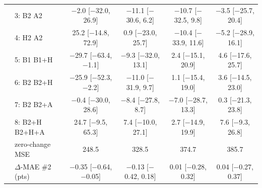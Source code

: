 \begin{table}[h]
{\begin{tabular}{llcccc}
 & 3: B2 \cto{} A2 & $-$2.0 [$-$32.0, 26.9] & $-$11.1 [$-$30.6, 6.2] & $-$10.7 [$-$32.5, 9.8] & $-$3.5 [$-$25.7, 20.4] \\
 & 4: H2 \cto{} A2 & 25.2 [$-$14.8, 72.9] & 0.9 [$-$23.0, 25.7] & $-$10.4 [$-$33.9, 11.6] & $-$5.2 [$-$28.9, 16.1] \\
 & 5: B1 \cto{} B1+H & $-$29.7 [$-$63.4, $-$1.1] & $-$9.3 [$-$32.0, 13.1] & 2.4 [$-$15.1, 20.9] & 4.6 [$-$17.6, 25.7] \\
 & 6: B2 \cto{} B2+H & $-$25.9 [$-$52.3, $-$2.2] & $-$11.0 [$-$31.9, 9.7] & 1.1 [$-$15.4, 19.0] & 3.6 [$-$14.5, 23.0] \\
 & 7: B2 \cto{} B2+A & $-$0.4 [$-$30.0, 28.6] & $-$8.4 [$-$27.8, 8.7] & $-$7.0 [$-$28.7, 13.3] & 0.3 [$-$21.3, 23.8] \\
 & 8: B2+H \cto{} B2+H+A & 24.7 [$-$9.5, 65.3] & 7.4 [$-$10.0, 27.1] & 2.7 [$-$14.9, 19.9] & 7.6 [$-$9.3, 26.8] \\
 & zero-change MSE & 248.5 & 328.5 & 374.7 & 385.7 \\
 & $\Delta$-MAE \#2 (pts) & $-$0.35 [$-$0.64, $-$0.05] & $-$0.13 [$-$0.42, 0.18] & 0.01 [$-$0.28, 0.32] & 0.04 [$-$0.27, 0.37] \\
\bottomrule
\end{tabular}
}
\end{table}

